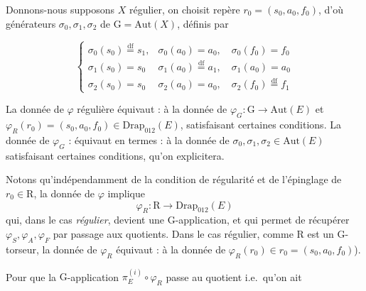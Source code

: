 \documentclass[11pt,a4paper]{article}
\begin{document}
Donnons-nous supposons $X$ régulier, on choisit repère $r_0=(s_0,a_0,f_0)$, d'où générateurs $\sigma_0,\sigma_1,\sigma_2$ de $\mathrm{G}=\mathrm{Aut}(X)$, définis par

\[
\begin{cases}
\sigma_0(s_0)\overset{\mathrm{df}}{=}s_1, & \sigma_0(a_0)=a_0,\quad \sigma_0(f_0)=f_0\\
\sigma_1(s_0)=s_0 & \sigma_1(a_0)\overset{\mathrm{df}}{=}a_1,\quad \sigma_1(a_0)=a_0\\
\sigma_2(s_0)=s_0 & \sigma_2(a_0)=a_0,\quad \sigma_2(f_0)\overset{\mathrm{df}}{=}f_1
\end{cases}
\]

La donnée de $\varphi$ régulière équivaut : à la donnée de $\varphi_G:\mathrm{G}\to\mathrm{Aut}(E)$ et $\varphi_R(r_0)=(s_0,a_0,f_0)\in\mathrm{Drap}_{012}(E)$, satisfaisant certaines conditions. La donnée de $\varphi_G$ : équivaut en termes  : à la donnée de $\sigma_0,\sigma_1,\sigma_2\in\mathrm{Aut}(E)$ satisfaisant certaines conditions, qu'on explicitera.

Notons qu'indépendamment de la condition de régularité et de l'épinglage  de $r_0\in\mathrm{R}$, la donnée de $\varphi$ implique
\[
\varphi_R : \mathrm{R}\longrightarrow \mathrm{Drap}_{012}(E)
\]
qui, dans le cas \emph{régulier}, devient une $\mathrm{G}$-application, et qui permet de récupérer $\varphi_S,\varphi_A,\varphi_F$ par passage aux quotients. Dans le cas \struck{\ill{}} régulier, comme $\mathrm{R}$ est un $\mathrm{G}$-torseur, la donnée de $\varphi_R$ équivaut : à la donnée de $\varphi_R(r_0)\in r_0=(s_0,a_0,f_0)$).

Pour que la \struck{\ill{}} $\mathrm{G}$-application \uncertain{\ill{}} $\pi_E^{(i)}\circ\varphi_R$ passe au quotient  \ill{}  i.e.\ qu'on ait

\end{document}
